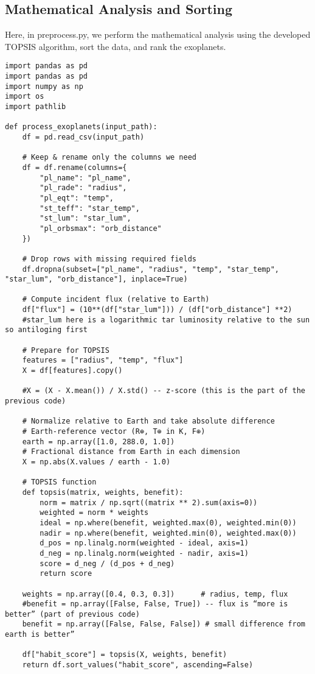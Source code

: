 \documentclass[12pt]{article}
\begin{document}
\subsection{Mathematical Analysis and Sorting}\label{subsec:process}
Here, in preprocess.py, we perform the mathematical analysis using the developed TOPSIS algorithm, sort the data, and rank the exoplanets. 
\begin{verbatim}
import pandas as pd
import pandas as pd
import numpy as np
import os
import pathlib

def process_exoplanets(input_path):
    df = pd.read_csv(input_path)

    # Keep & rename only the columns we need
    df = df.rename(columns={
        "pl_name": "pl_name",
        "pl_rade": "radius",
        "pl_eqt": "temp",
        "st_teff": "star_temp",
        "st_lum": "star_lum",
        "pl_orbsmax": "orb_distance"
    })

    # Drop rows with missing required fields
    df.dropna(subset=["pl_name", "radius", "temp", "star_temp", "star_lum", "orb_distance"], inplace=True)
    
    # Compute incident flux (relative to Earth)
    df["flux"] = (10**(df["star_lum"])) / (df["orb_distance"] **2)
    #star_lum here is a logarithmic tar luminosity relative to the sun so antiloging first

    # Prepare for TOPSIS
    features = ["radius", "temp", "flux"]
    X = df[features].copy()
    
    #X = (X - X.mean()) / X.std() -- z-score (this is the part of the previous code)

    # Normalize relative to Earth and take absolute difference
    # Earth‐reference vector (R⊕, T⊕ in K, F⊕)
    earth = np.array([1.0, 288.0, 1.0])
    # Fractional distance from Earth in each dimension
    X = np.abs(X.values / earth - 1.0)

    # TOPSIS function
    def topsis(matrix, weights, benefit):
        norm = matrix / np.sqrt((matrix ** 2).sum(axis=0))
        weighted = norm * weights
        ideal = np.where(benefit, weighted.max(0), weighted.min(0))
        nadir = np.where(benefit, weighted.min(0), weighted.max(0))
        d_pos = np.linalg.norm(weighted - ideal, axis=1)
        d_neg = np.linalg.norm(weighted - nadir, axis=1)
        score = d_neg / (d_pos + d_neg)
        return score

    weights = np.array([0.4, 0.3, 0.3])      # radius, temp, flux
    #benefit = np.array([False, False, True]) -- flux is “more is better” (part of previous code)
    benefit = np.array([False, False, False]) # small difference from earth is better”

    df["habit_score"] = topsis(X, weights, benefit)
    return df.sort_values("habit_score", ascending=False)


\end{verbatim}
\end{document}
